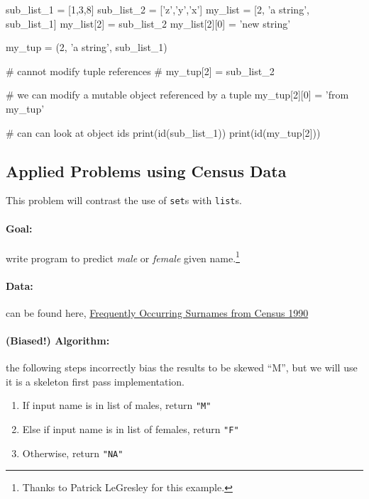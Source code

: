 \documentclass[12pt,letterpaper,twoside]{article}
\begin{document}
\begin{python}
sub_list_1 = [1,3,8]
sub_list_2 = ['z','y','x']
my_list = [2, 'a string', sub_list_1]
my_list[2] = sub_list_2
my_list[2][0] = 'new string'

my_tup = (2, 'a string', sub_list_1)

# cannot modify tuple references
# my_tup[2] = sub_list_2

# we can modify a mutable object referenced by a tuple
my_tup[2][0] = 'from my_tup'

# can can look at object ids
print(id(sub_list_1))
print(id(my_tup[2]))
\end{python}


\subsection{Applied Problems using Census Data}
This problem will contrast the use of \texttt{set}s with \texttt{list}s.

\paragraph{Goal:} write program to predict \emph{male} or \emph{female} given name.\footnote{Thanks to Patrick LeGresley for this example.}

\paragraph{Data:} can be found here, 
\href{http://www.census.gov/topics/population/genealogy/data/1990_census/1990_census_namefiles.html}{Frequently Occurring Surnames from Census 1990}

\paragraph{(Biased!) Algorithm:} the following steps incorrectly bias the results to be skewed ``M'', but we will use it is a skeleton first pass implementation.

\begin{enumerate}
\def\labelenumi{\arabic{enumi}.}
\tightlist
\item
  If input name is in list of males, return \texttt{"M"}
\item
  Else if input name is in list of females, return \texttt{"F"}
\item
  Otherwise, return \texttt{"NA"}
\end{enumerate}
\end{document}

